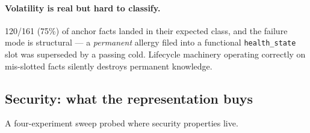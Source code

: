 \paragraph{Volatility is real but hard to classify.} 120/161 (75\%) of
anchor facts landed in their expected class, and the failure mode is
structural --- a \emph{permanent} allergy filed into a functional
\texttt{health\_state} slot was superseded by a passing cold. Lifecycle
machinery operating correctly on mis-slotted facts silently destroys
permanent knowledge.

\subsection{Security: what the representation buys}
\label{sec:security}

A four-experiment sweep probed where security properties live.


